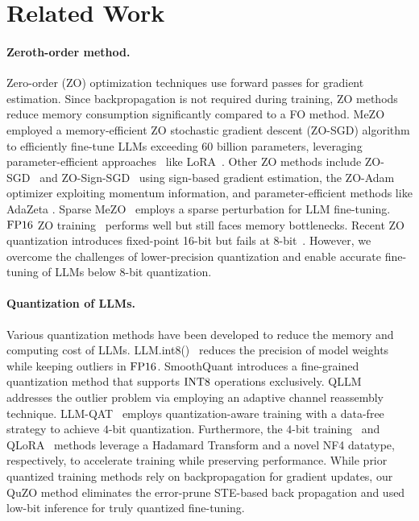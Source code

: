 \section{Related Work}
\label{gen_inst}
\paragraph{Zeroth-order method.} Zero-order (ZO) optimization techniques use forward passes for gradient estimation. Since backpropagation is not required during training, ZO methods reduce memory consumption significantly compared to a FO method. MeZO~\citep{malladi2024fine} employed a memory-efficient ZO stochastic gradient descent (ZO-SGD) algorithm to efficiently fine-tune LLMs exceeding $60$ billion parameters, leveraging parameter-efficient approaches~\cite{yang2024loretta,liu2021p} like LoRA~\cite{hu2021lora}. Other ZO methods include ZO-SGD~\citep{ghadimi2013stochastic} and ZO-Sign-SGD~\citep{liu2018signsgd} using sign-based gradient estimation, the ZO-Adam~\citep{chen2019zo} optimizer exploiting momentum information, and parameter-efficient methods like AdaZeta \cite{yang2024adazeta}. Sparse MeZO~\cite{liu2024sparse} employs a sparse perturbation for LLM fine-tuning. ${\rm FP}16$ ZO training~\citep{zhang2024revisiting} performs well but still faces memory bottlenecks. Recent ZO quantization introduces fixed-point 16-bit but fails at 8-bit~\cite{feng2024stepping}. However, we overcome the challenges of lower-precision quantization and enable accurate fine-tuning of LLMs below 8-bit quantization.


\paragraph{Quantization of LLMs.} Various quantization methods have been developed to reduce the memory and computing cost of LLMs. LLM.int8()~\citep{dettmers2022gpt3} reduces the precision of model weights while keeping outliers in ${\rm FP}16$. SmoothQuant \citep{xiao2023smoothquant} introduces a fine-grained quantization method that supports ${\rm INT}8$ operations exclusively. QLLM~\citep{liu2023qllm} addresses the outlier problem via employing an adaptive channel reassembly technique. LLM-QAT~\citep{liu2023llm} employs quantization-aware training with a data-free strategy to achieve $4$-bit quantization. Furthermore, the $4$-bit training~\citep{xi2023training} and QLoRA~\citep{dettmers2024qlora} methods leverage a Hadamard Transform and a novel NF4 datatype, respectively, to accelerate training while preserving performance. While prior quantized training methods rely on backpropagation for gradient updates, our QuZO method eliminates the error-prune STE-based back propagation and used low-bit inference for truly quantized fine-tuning.


%